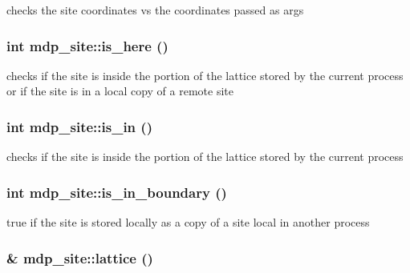 checks the site coordinates vs the coordinates passed as args \hypertarget{classmdp__site_a1457471b74c722514712f1efb1093f63}{
\subsubsection[{is\_\-here}]{\setlength{\rightskip}{0pt plus 5cm}int mdp\_\-site::is\_\-here ()}}
\label{classmdp__site_a1457471b74c722514712f1efb1093f63}
checks if the site is inside the portion of the lattice stored by the current process or if the site is in a local copy of a remote site \hypertarget{classmdp__site_a57ff5d47780a90ad36c9368360ad2d89}{
\subsubsection[{is\_\-in}]{\setlength{\rightskip}{0pt plus 5cm}int mdp\_\-site::is\_\-in ()}}
\label{classmdp__site_a57ff5d47780a90ad36c9368360ad2d89}
checks if the site is inside the portion of the lattice stored by the current process \hypertarget{classmdp__site_a57188578cccbd53d6ff5ef5b791d32a4}{
\subsubsection[{is\_\-in\_\-boundary}]{\setlength{\rightskip}{0pt plus 5cm}int mdp\_\-site::is\_\-in\_\-boundary ()}}
\label{classmdp__site_a57188578cccbd53d6ff5ef5b791d32a4}
true if the site is stored locally as a copy of a site local in another process \hypertarget{classmdp__site_aae3a1de2fd7fafccbd1d6bd971c908c4}{
\subsubsection[{lattice}]{\& mdp\_\-site::lattice ()}}
\label{classmdp__site_aae3a1de2fd7fafccbd1d6bd971c908c4}


